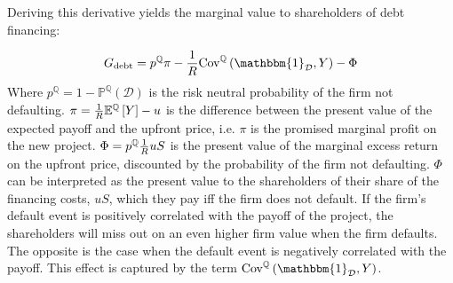 \documentclass[../main.tex]{subfiles}
\begin{document}

        Deriving this derivative yields the marginal value to shareholders of debt financing:

            \begin{equation}
                G_{\text{debt}} = 
                    p^{\mathbb{Q}} \pi 
                    - \discountfactor 
                    \text{Cov}^{\mathbb{Q}}\left(
                        \mathbbm{1}_{\mathcal{D}}, 
                        Y
                    \right) 
                    - \Phi
                    \label{eqn:marginal-shareholder-value-debt-financing}
            \end{equation}
        Where $p^{\mathbb{Q}} = 1 - \mathbb{P}^{\mathbb{Q}}\left(\mathcal{D}\right)$ is the risk neutral probability of the firm not defaulting. 
        $\pi = \frac{1}{R} \mathbb{E}^{\mathbb{Q}}\left[Y\right] - u$ 
        is the difference between the present value of the expected payoff and the upfront price, 
        i.e. $\pi$ is the promised marginal profit on the new project. 
        $\Phi = p^{\mathbb{Q}} \frac{1}{R} u S$
        is the present value of the marginal excess return on the upfront price, 
        discounted by the probability of the firm not defaulting.
        $\Phi$ can be interpreted as the present value to the shareholders of their share of the financing costs, $uS$,
        which they pay iff the firm does not default. 
        If the firm's default event is positively correlated with the payoff of the project,
        the shareholders will miss out on an even higher firm value when the firm defaults.
        The opposite is the case when the default event is negatively correlated with the payoff.
        This effect is captured by the term 
        $\text{Cov}^{\mathbb{Q}}\left(\mathbbm{1}_{\mathcal{D}}, Y\right)$.
\end{document}

